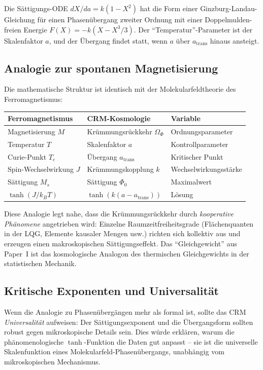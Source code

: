 \documentclass[11pt,a4paper]{article}
\begin{document}
Die S\"attigungs-ODE $dX/da = k(1 - X^2)$ hat die Form einer Ginzburg-Landau-Gleichung f\"ur einen Phasen\"ubergang zweiter Ordnung mit einer Doppelmulden-freien Energie $F(X) = -k(X - X^3/3)$. Der "`Temperatur"'-Parameter ist der Skalenfaktor $a$, und der \"Ubergang findet statt, wenn $a$ \"uber $a_{\mathrm{trans}}$ hinaus ansteigt.

\subsection{Analogie zur spontanen Magnetisierung}

Die mathematische Struktur ist identisch mit der Molekularfeldtheorie des Ferromagnetismus:
\begin{center}
\begin{tabular}{lll}
\toprule
\textbf{Ferromagnetismus} & \textbf{CRM-Kosmologie} & \textbf{Variable} \\
\midrule
Magnetisierung $M$ & Kr\"ummungsr\"uckkehr $\Omega_\Phi$ & Ordnungsparameter \\
Temperatur $T$ & Skalenfaktor $a$ & Kontrollparameter \\
Curie-Punkt $T_c$ & \"Ubergang $a_{\mathrm{trans}}$ & Kritischer Punkt \\
Spin-Wechselwirkung $J$ & Kr\"ummungskopplung $k$ & Wechselwirkungsst\"arke \\
S\"attigung $M_s$ & S\"attigung $\Phi_0$ & Maximalwert \\
$\tanh(J/k_BT)$ & $\tanh(k(a - a_{\mathrm{trans}}))$ & L\"osung \\
\bottomrule
\end{tabular}
\end{center}

Diese Analogie legt nahe, dass die Kr\"ummungsr\"uckkehr durch \textit{kooperative Ph\"anomene} angetrieben wird: Einzelne Raumzeitfreiheitsgrade (Fl\"achenquanten in der LQG, Elemente kausaler Mengen usw.) richten sich kollektiv aus und erzeugen einen makroskopischen S\"attigungseffekt. Das "`Gleichgewicht"' aus Paper~I ist das kosmologische Analogon des thermischen Gleichgewichts in der statistischen Mechanik.

\subsection{Kritische Exponenten und Universalit\"at}

Wenn die Analogie zu Phasen\"uberg\"angen mehr als formal ist, sollte das CRM \textit{Universalit\"at} aufweisen: Der S\"attigungsexponent und die \"Ubergangsform sollten robust gegen mikroskopische Details sein. Dies w\"urde erkl\"aren, warum die ph\"anomenologische $\tanh$-Funktion die Daten gut anpasst -- sie ist die universelle Skalenfunktion eines Molekularfeld-Phasen\"ubergangs, unabh\"angig vom mikroskopischen Mechanismus.
\end{document}
